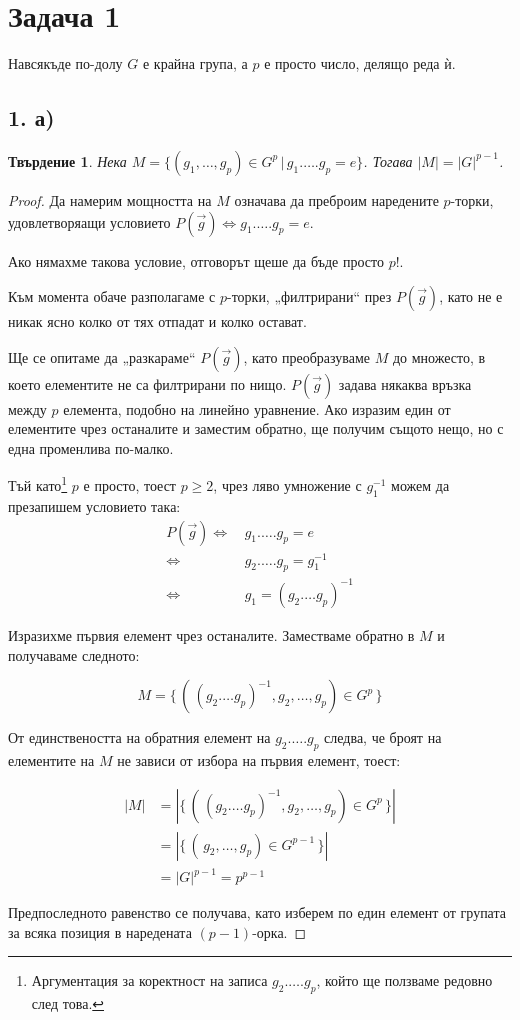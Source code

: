 \documentclass{article}
\newtheorem*{prop}{Твърдение}
\begin{document}
\section*{Задача 1}
Навсякъде по-долу $G$ е крайна група, а $p$ е просто число, делящо реда ѝ.
\subsection*{1. а)}
\begin{prop}
    Нека $M = \{(g_1, \dots, g_p) \in G^p \, | \, g_1.\dots.g_p = e\}$.
    Тогава $|M| = |G|^{p-1}$.
\end{prop}
\begin{proof}
    Да намерим мощността на $M$ означава да преброим наредените $p$-торки, удовлетворяащи условието
    $P(\vec g) \Leftrightarrow {g_1.\dots. g_p = e}$.

    Ако нямахме такова условие, отговорът щеше да бъде просто $p!$.

    Към момента обаче разполагаме с $p$-торки, „филтрирани“ през $P(\vec g)$, като не е никак ясно колко от тях отпадат и колко остават.

    Ще се опитаме да „разкараме“ $P(\vec g)$, като преобразуваме $M$ до множесто, в което елементите не са филтрирани по нищо.
    $P(\vec g)$ задава някаква връзка между $p$ елемента, подобно на линейно уравнение. Ако изразим един от елементите чрез останалите и заместим обратно, ще получим същото нещо, но с една променлива по-малко.

    Тъй като\footnote{Аргументация за коректност на записа $g_2 . \dots . g_p$, който ще ползваме редовно след това.} $p$ е просто, тоест $p \ge 2$, чрез ляво умножение с $g_1^{-1}$ можем да презапишем условието така:
    \begin{align*}
        P(\vec g) \Leftrightarrow \, &g_1.\dots.g_p = e \\
        \Leftrightarrow \, &g_2. \dots . g_p = g_1^{-1} \\
        \Leftrightarrow \, &g_1 = (g_2 . \dots g_p)^{-1}
    \end{align*}

    Изразихме първия елемент чрез останалите. Заместваме обратно в $M$ и получаваме следното:

    $$M = \{ \, (\,(g_2 . \dots g_p)^{-1}, g_2, \dots, g_p) \in G^p \,\}$$

    От единствеността на обратния елемент на $g_2.\dots.g_p$ следва, че броят на елементите на $M$ не зависи от избора на първия елемент, тоест:

    \begin{align*}
        |M| &= |\{ \, (\,(g_2 . \dots g_p)^{-1}, g_2, \dots, g_p) \in G^p \,\}|\\
        &= |\{ \, (\, g_2, \dots, g_p) \in G^{p-1} \,\}|\\
        &= {|G|}^{p-1} = p^{p-1}
    \end{align*}

    Предпоследното равенство се получава, като изберем по един елемент от групата за всяка позиция в наредената ${(p-1)}$-орка.
\end{proof}
\end{document}
